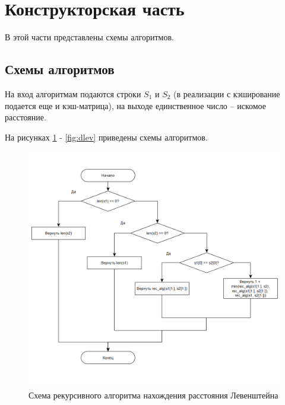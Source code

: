 \documentclass{article}
\begin{document}
\clearpage\section{Конструкторская часть}
В этой части представлены схемы алгоритмов.

\subsection{Схемы алгоритмов}
На вход алгоритмам подаются строки $S_{1}$ и $S_{2}$ (в реализации с кэширование подается еще и кэш-матрица), на 
выходе единственное число -- искомое расстояние.

На рисунках \ref{fig:rec_lev} - \ref{fig:dlev} приведены схемы алгоритмов.

\begin{figure}[h]
	\centering
	\includegraphics[scale=0.7]{tools/alg_1.png}
	\caption{Схема рекурсивного алгоритма нахождения расстояния Левенштейна}
	\label{fig:rec_lev}
\end{figure}
\end{document}
